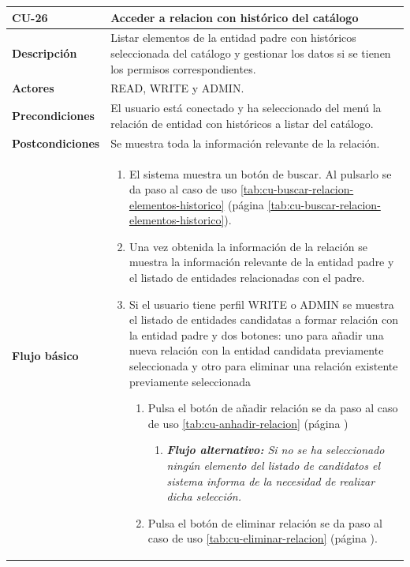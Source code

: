 \begin{table} [H]
    \centering
    \setlength{\leftmargini}{0.4cm}
	\resizebox{14cm}{!} { %
    \begin{tabular}{| m{3cm} | m{11cm} |}   
    \hline
	  \textbf{CU-26} & \textbf{Acceder a relacion con histórico del catálogo} \\\hline
	  \textbf{Descripción} & Listar elementos de la entidad  padre con históricos seleccionada del catálogo y gestionar los datos si se tienen los permisos correspondientes. \\\hline
	  \textbf{Actores} & READ, WRITE y ADMIN. \\\hline
	  \textbf{Precondiciones} & El usuario está conectado y ha seleccionado del menú la relación de entidad con históricos a listar del catálogo. \\\hline
	  \textbf{Postcondiciones} & Se muestra toda la información relevante de la relación. \\\hline
	  \textbf{Flujo básico} & 
		\begin{enumerate}
	  	\item El sistema muestra un botón de buscar. Al pulsarlo se da paso al caso de uso \ref{tab:cu-buscar-relacion-elementos-historico} (página \ref{tab:cu-buscar-relacion-elementos-historico}).
	  	\item Una vez obtenida la información de la relación se muestra la información relevante de la entidad padre y el listado de entidades relacionadas con el padre.
	  	\item Si el usuario tiene perfil WRITE o ADMIN se muestra el listado de entidades candidatas a formar relación con la entidad padre y dos botones: uno para añadir una nueva relación con la entidad candidata previamente seleccionada y otro para eliminar una relación existente previamente seleccionada
	  	\begin{enumerate}
		        \item Pulsa el botón de añadir relación se da paso al caso de uso \ref{tab:cu-anhadir-relacion} (página \pageref{tab:cu-anhadir-relacion})
					\begin{enumerate}	
			   		\item  \textit{\textbf{Flujo alternativo:} Si no se ha seleccionado ningún elemento del listado de candidatos el sistema informa de la necesidad de realizar dicha selección.}
			   		\end{enumerate}		
		        \item Pulsa el botón de eliminar relación se da paso al caso de uso \ref{tab:cu-eliminar-relacion} (página \pageref{tab:cu-eliminar-relacion}).

\end{enumerate}
\end{enumerate}
\end{tabular}}
\end{table}
